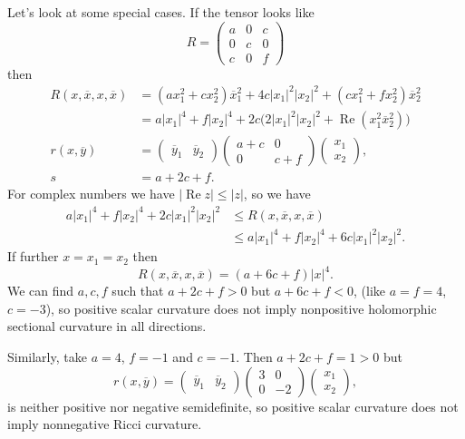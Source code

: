\documentclass[11pt]{amsart}
\theoremstyle{definition}
\def\ov#1{\overline{#1}}
\DeclareMathOperator{\re}{Re}
\begin{document}
Let's look at some special cases. If the tensor looks like
$$
R =
\begin{pmatrix}
a & 0 & c
\\
0 & c & 0
\\
c & 0 & f
\end{pmatrix}
$$
then
\begin{align*}
R(x, \ov x, x, \ov x)
&= (a x_1^2 + c x_2^2) \ov x_1^2
+ 4 c |x_1|^2 |x_2|^2
+ (c x_1^2 + f x_2^2) \ov x_2^2
\\
&= a |x_1|^4 + f |x_2|^4
+ 2 c \bigl(2 |x_1|^2 |x_2|^2 + \re(x_1^2 \ov x_2^2) \bigr)
\\
r(x, \ov y)
&=
\begin{pmatrix}\ov y_1 & \ov y_2 \end{pmatrix}
\begin{pmatrix}
a + c & 0 \\ 0 & c + f
\end{pmatrix}
\begin{pmatrix} x_1 \\ x_2 \end{pmatrix},
\\
s &= a + 2c + f.
\end{align*}
For complex numbers we have $|\re z| \leq |z|$, so we have
\begin{align*}
a |x_1|^4 + f |x_2|^4 + 2c |x_1|^2 |x_2|^2
&\leq R(x, \ov x, x, \ov x)
\\
&\leq a |x_1|^4 + f |x_2|^4 + 6c |x_1|^2 |x_2|^2.
\end{align*}
If further $x = x_1 = x_2$ then
$$
R(x, \ov x, x, \ov x)
= (a + 6c + f) |x|^4.
$$
We can find $a, c, f$ such that $a + 2c + f > 0$ but $a + 6c + f < 0$,
(like $a = f = 4$, $c = -3$), so positive scalar curvature does not imply
nonpositive holomorphic sectional curvature in all directions.

Similarly, take $a = 4$, $f = -1$ and $c = -1$. Then $a + 2c + f = 1 > 0$ but
$$
r(x, \ov y) =
\begin{pmatrix}\ov y_1 & \ov y_2 \end{pmatrix}
\begin{pmatrix}
3 & 0 \\ 0 & -2
\end{pmatrix}
\begin{pmatrix} x_1 \\ x_2 \end{pmatrix},
$$
is neither positive nor negative semidefinite, so positive scalar curvature
does not imply nonnegative Ricci curvature.
\end{document}
